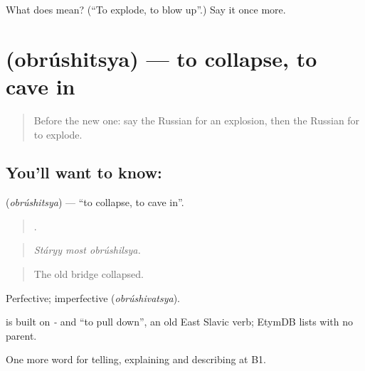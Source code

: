 \begin{tcolorbox}[breakable,colback=teal!4,colframe=teal!35!black,title={Before you move on}]
What does  mean? (\textquotedblleft{}To explode, to blow up\textquotedblright{}.) Say it once more.
\end{tcolorbox}
\section[\texorpdfstring{\ru{обрушиться} (obrúshitsya)}{обрушиться (obrúshitsya)}]{ (obrúshitsya) — to collapse, to cave in}

\label{lesson:RU-C301-obrushitsya}



\begin{quote}
Before the new one: say the Russian for an explosion, then the Russian for to explode.
\end{quote}

\subsection*{You'll want to know: }
\textbf{} (\emph{obrúshitsya}) — \textquotedblleft{}to collapse, to cave in\textquotedblright{}.

\begin{quote}
  .
\end{quote}

\begin{quote}
\emph{Stáryy most obrúshilsya.}
\end{quote}

\begin{quote}
The old bridge collapsed.
\end{quote}

Perfective; imperfective \emph{} (\emph{obrúshivatsya}).

\begin{cousinweb}
\emph{} is built on \emph{-} and \emph{} \textquotedblleft{}to pull down\textquotedblright{}, an old East Slavic verb; EtymDB lists \emph{} with no parent.
\end{cousinweb}

\begin{grammarlens}[title={What you've built}]
One more word for telling, explaining and describing at B1.
\end{grammarlens}


